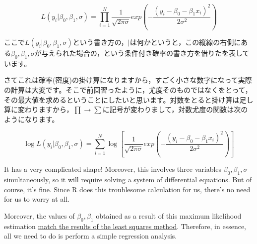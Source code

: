 \documentclass{ltjbook}
\begin{document}
\[ L(y_i | \beta_0,\beta_1,\sigma) = \prod_{i=1}^N \frac{1}{\sqrt{2\pi \sigma}}exp\left(- \frac{(y_i-\beta_0 - \beta_1 x_i)^2}{2\sigma^2}\right)\]

ここで$L(y_i | \beta_0,\beta_1,\sigma) $という書き方の，$\mid$は何かというと，この縦線の右側にある$\beta_0,\beta_1,\sigma$が与えられた場合の，という条件付き確率の書き方を借りたを表しています。

さてこれは確率(密度)の掛け算になりますから，すごく小さな数字になって実際の計算は大変です。そこで前回習ったように，尤度そのものではなくをとって，その最大値を求めるということにしたいと思います。対数をとると掛け算は足し算に変わりますから，$\prod \to \sum$に記号が変わりまして，対数尤度の関数は次のようになります。

\[ \log L(y_i | \beta_0,\beta_1,\sigma) = \sum_{i=1}^N \log \left[ \frac{1}{\sqrt{2\pi \sigma}}exp\left( -\frac{(y_i-\beta_0 - \beta_1 x_i)^2}{2\sigma^2}\right)\right]\]

It has a very complicated shape! Moreover, this involves three variables $\beta_0,\beta_1,\sigma$ simultaneously, so it will require solving a system of differential equations.
But of course, it's fine. Since R does this troublesome calculation for us, there's no need for us to worry at all.

Moreover, the values of $\beta_0, \beta_1$ obtained as a result of this maximum likelihood estimation \underline{match the results of the least squares method}.
Therefore, in essence, all we need to do is perform a simple regression analysis.

\end{document}
